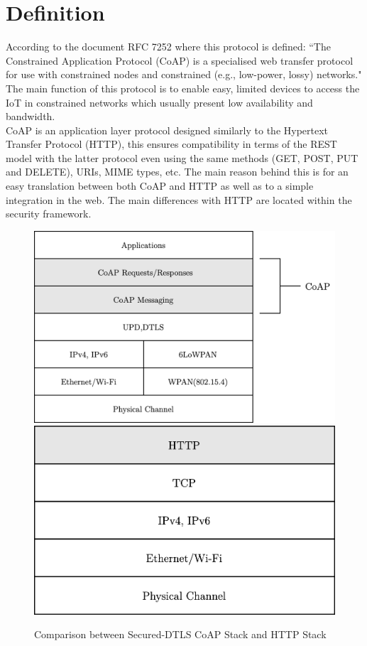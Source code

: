 \documentclass[11pt]{book}
\begin{document}
\section{Definition}
According to the document RFC 7252 where this protocol is defined: ``The Constrained Application Protocol (CoAP) is a specialised web transfer protocol for use with constrained nodes and constrained (e.g., low-power, lossy) networks." The main function of this protocol is to enable easy, limited devices to access the IoT in constrained networks which usually present low availability and bandwidth. \\
CoAP is an application layer protocol designed similarly to the Hypertext Transfer Protocol (HTTP), this ensures compatibility in terms of the REST model with the latter protocol even using the same methods (GET, POST, PUT and DELETE), URIs, MIME types, etc. The main reason behind this is for an easy translation between both CoAP and HTTP as well as to a simple integration in the web. The main differences with HTTP are located within the security framework. \\
\begin{figure}[H]
	\centering
	\includegraphics [scale=0.175] {coapstack.png}
	\includegraphics [scale=0.175] {httpstack.png}
	\caption{Comparison between Secured-DTLS CoAP Stack and HTTP Stack}
\end{figure}
\end{document}
